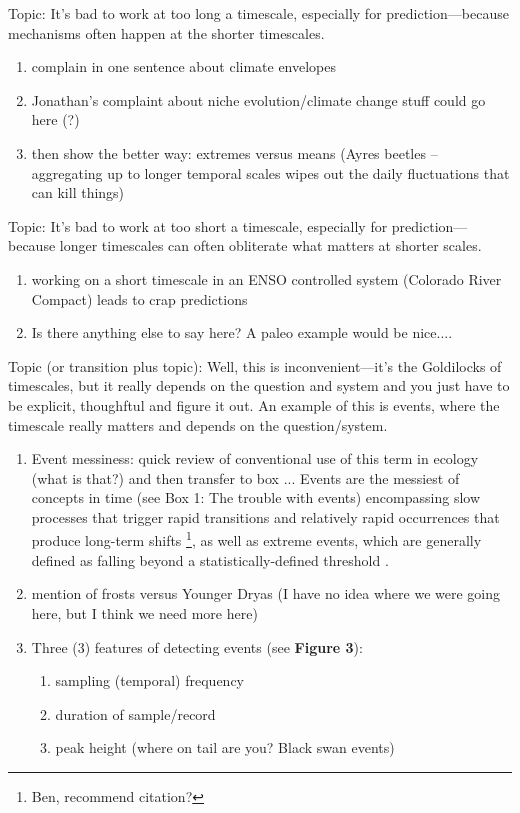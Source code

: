 \documentclass[11pt,a4paper,oneside]{article}
\begin{document}
\noindent Topic: It's bad to work at too long a timescale, especially for prediction---because mechanisms often happen at the shorter timescales.
\begin{enumerate}
\item complain in one sentence about climate envelopes
\item Jonathan's complaint about niche evolution/climate change stuff could go here (?)
\item then show the better way: extremes versus means (Ayres beetles -- aggregating up to longer temporal scales wipes out the daily fluctuations that can kill things)
\end{enumerate}

\noindent Topic: It's bad to work at too short a timescale, especially for prediction---because longer timescales can often obliterate what matters at shorter scales.
\begin{enumerate}
\item working on a short timescale in an ENSO controlled system (Colorado River Compact) leads to crap predictions
\item Is there anything else to say here? A paleo example would be nice....
\end{enumerate}

\noindent Topic (or transition plus topic): Well, this is inconvenient---it's the Goldilocks of timescales, but it really depends on the question and system and you just have to be explicit, thoughftul and figure it out. An example of this is events, where the timescale really matters and depends on the question/system.
\begin{enumerate}
\item Event messiness: quick review of conventional use of this term in ecology (what is that?) and then transfer to box ... Events are the messiest of concepts in time (see Box 1: The trouble with events) encompassing slow processes that trigger rapid transitions \citep{Foley2003} and relatively rapid occurrences that produce long-term shifts \footnote{Ben, recommend citation?}, as well as extreme events, which are generally defined as falling beyond a statistically-defined threshold \citep{ipccextreme2012}.
\item mention of frosts versus Younger Dryas (I have no idea where we were going here, but I think we need more here)
\item Three (3) features of detecting events (see {\bf Figure 3}):
\begin{enumerate}
\item sampling (temporal) frequency
\item duration of sample/record
\item peak height (where on tail are you? Black swan events)
\end{enumerate}
\end{enumerate}
 
\end{document}
